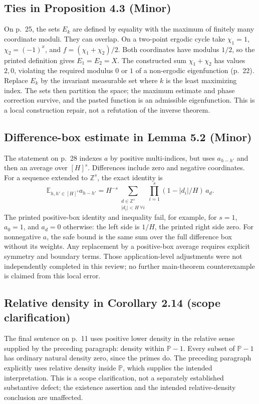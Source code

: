 \documentclass[10pt]{article}
\begin{document}
\subsection*{Ties in Proposition 4.3 (Minor)}
On p. 25, the sets \(E_k\) are defined by equality with the maximum of finitely many coordinate moduli. They can overlap. On a two-point ergodic cycle take \(\chi_1=1\), \(\chi_2=(-1)^x\), and \(f=(\chi_1+\chi_2)/2\). Both coordinates have modulus \(1/2\), so the printed definition gives \(E_1=E_2=X\). The constructed sum \(\chi_1+\chi_2\) has values \(2,0\), violating the required modulus \(0\) or \(1\) of a non-ergodic eigenfunction (p. 22). Replace \(E_k\) by the invariant measurable set where \(k\) is the least maximizing index. The sets then partition the space; the maximum estimate and phase correction survive, and the pasted function is an admissible eigenfunction. This is a local construction repair, not a refutation of the inverse theorem.\par
\subsection*{Difference-box estimate in Lemma 5.2 (Minor)}
The statement on p. 28 indexes \(a\) by positive multi-indices, but uses \(a_{h-h'}\) and then an average over \([H]^s\). Differences include zero and negative coordinates. For a sequence extended to \(\mathbb Z^s\), the exact identity is \[\mathbb E_{h,h'\in[H]^s}a_{h-h'}
 =H^{-s}\!\!\sum_{\substack{d\in\mathbb Z^s\\|d_i|<H\ \forall i}}
 \prod_{i=1}^s(1-|d_i|/H)\,a_d .\] The printed positive-box identity and inequality fail, for example, for \(s=1\), \(a_0=1\), and \(a_d=0\) otherwise: the left side is \(1/H\), the printed right side zero. For nonnegative \(a\), the safe bound is the same sum over the full difference box without its weights. Any replacement by a positive-box average requires explicit symmetry and boundary terms. Those application-level adjustments were not independently completed in this review; no further main-theorem counterexample is claimed from this local error.\par
\subsection*{Relative density in Corollary 2.14 (scope clarification)}
The final sentence on p. 11 uses positive lower density in the relative sense supplied by the preceding paragraph: density within \(\mathbb P-1\). Every subset of \(\mathbb P-1\) has ordinary natural density zero, since the primes do. The preceding paragraph explicitly uses relative density inside \(\mathbb P\), which supplies the intended interpretation. This is a scope clarification, not a separately established substantive defect; the existence assertion and the intended relative-density conclusion are unaffected.\par
\end{document}
